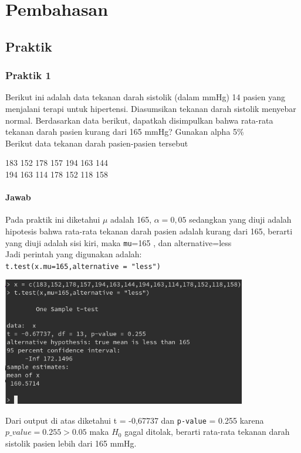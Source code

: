 \documentclass[a4paper,12pt]{article}
\begin{document}
\section{Pembahasan}
\subsection{Praktik}
\subsubsection{Praktik 1}
Berikut ini adalah data tekanan darah sistolik (dalam mmHg) 14 pasien yang menjalani terapi untuk hipertensi. Diasumsikan tekanan darah sistolik menyebar normal. Berdasarkan data berikut, dapatkah disimpulkan bahwa rata-rata tekanan darah pasien kurang dari 165 mmHg? Gunakan alpha 5\%\\
Berikut data tekanan darah pasien-pasien tersebut\\
\begin{center}
    183 152 178 157 194 163 144\\
    194 163 114 178 152 118 158
\end{center}

\paragraph{Jawab\\}
Pada praktik ini diketahui $\mu$ adalah 165, $\alpha=0,05$ sedangkan yang diuji adalah hipotesis bahwa rata-rata tekanan darah pasien adalah kurang dari 165, berarti yang diuji adalah sisi kiri, maka \texttt{mu}=165 , dan alternative=less\\
Jadi perintah yang digunakan adalah:\\
\texttt{t.test(x.mu=165,alternative = "less")}\\
\begin{center}
    \includegraphics[width=0.8\textwidth]{prak1.png}
\end{center}
Dari output di atas diketahui t = -0,67737 dan \texttt{p-value} = 0.255
karena $p\_value = 0.255 > 0.05$ maka $H_{0}$ gagal ditolak, berarti rata-rata tekanan darah sistolik pasien lebih dari 165 mmHg.
\end{document}

